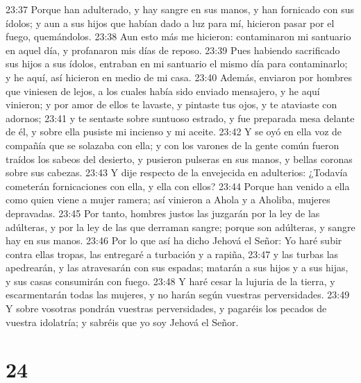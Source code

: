 23:37 Porque han adulterado, y hay sangre en sus manos, y han fornicado con sus ídolos; y aun a sus hijos que habían dado a luz para mí, hicieron pasar por el fuego, quemándolos.  
23:38 Aun esto más me hicieron: contaminaron mi santuario en aquel día, y profanaron mis días de reposo.  
23:39 Pues habiendo sacrificado sus hijos a sus ídolos, entraban en mi santuario el mismo día para contaminarlo; y he aquí, así hicieron en medio de mi casa.  
23:40 Además, enviaron por hombres que viniesen de lejos, a los cuales había sido enviado mensajero, y he aquí vinieron; y por amor de ellos te lavaste, y pintaste tus ojos, y te ataviaste con adornos;  
23:41 y te sentaste sobre suntuoso estrado, y fue preparada mesa delante de él, y sobre ella pusiste mi incienso y mi aceite.  
23:42 Y se oyó en ella voz de compañía que se solazaba con ella; y con los varones de la gente común fueron traídos los sabeos del desierto, y pusieron pulseras en sus manos, y bellas coronas sobre sus cabezas.  
23:43 Y dije respecto de la envejecida en adulterios: ¿Todavía cometerán fornicaciones con ella, y ella con ellos?  
23:44 Porque han venido a ella como quien viene a mujer ramera; así vinieron a Ahola y a Aholiba, mujeres depravadas.  
23:45 Por tanto, hombres justos las juzgarán por la ley de las adúlteras, y por la ley de las que derraman sangre; porque son adúlteras, y sangre hay en sus manos.  
23:46 Por lo que así ha dicho Jehová el Señor: Yo haré subir contra ellas tropas, las entregaré a turbación y a rapiña,  
23:47 y las turbas las apedrearán, y las atravesarán con sus espadas; matarán a sus hijos y a sus hijas, y sus casas consumirán con fuego.  
23:48 Y haré cesar la lujuria de la tierra, y escarmentarán todas las mujeres, y no harán según vuestras perversidades.  
23:49 Y sobre vosotras pondrán vuestras perversidades, y pagaréis los pecados de vuestra idolatría; y sabréis que yo soy Jehová el Señor.  

\chapter{24}

